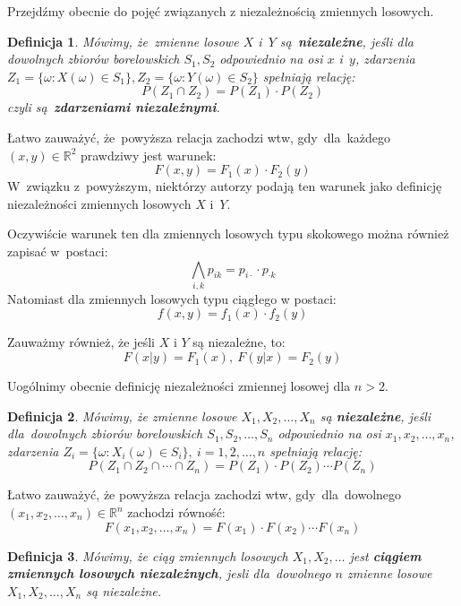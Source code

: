 \documentclass[10pt,a4paper]{article}
\newtheorem{definition}{Definicja}[section]
\numberwithin{equation}{subsection}
\begin{document}
Przejdźmy obecnie do pojęć związanych z niezależnością zmiennych losowych.
\begin{definition}
  Mówimy, że~zmienne losowe $X$ i~$Y$ są~\textbf{niezależne}, jeśli dla
  dowolnych zbiorów borelowskich $S_1,S_2$ odpowiednio na osi $x$ i~$y$,
  zdarzenia $Z_1=\{\omega:X(\omega)\in S_1\}, Z_2=\{\omega:Y(\omega)\in S_2\}$
  spełniają relację:
  \begin{equation}
    P(Z_1\cap Z_2) = P(Z_1)\cdot P(Z_2)
  \end{equation}
  czyli są~\textbf{zdarzeniami niezależnymi}.
\end{definition}

Łatwo zauważyć, że~powyższa relacja zachodzi wtw, gdy~dla~każdego
$(x,y)\in\mathbb{R}^2$ prawdziwy jest warunek:
\[
  F(x,y)=F_1(x)\cdot F_2(y)
\]
W~związku z~powyższym, niektórzy autorzy podają ten warunek jako definicję
niezależności zmiennych losowych $X$ i~$Y$.

Oczywiście warunek ten dla zmiennych losowych typu skokowego można również
zapisać w~postaci:
\[
  \bigwedge_{i,k}p_{ik}=p_{i\cdot}\cdot p_{\cdot k}
\]
Natomiast dla zmiennych losowych typu ciągłego w postaci:
\[
  f(x,y)=f_1(x)\cdot f_2(y)
\]

Zauważmy również, że jeśli $X$ i $Y$ są niezależne, to:
\[
  F(x|y) = F_1(x),~F(y|x)=F_2(y)
\]

Uogólnimy obecnie definicję niezależności zmiennej losowej dla $n>2$.
\begin{definition}
  Mówimy, że zmienne losowe $X_1,X_2,\dotsc,X_n$ są \textbf{niezależne}, jeśli
  dla~dowolnych zbiorów borelowskich $S_1,S_2,\dotsc,S_n$ odpowiednio na osi
  $x_1,x_2,\dotsc,x_n$, zdarzenia $Z_i=\{\omega:X_i(\omega)\in S_i\},~i=1,2,
  \dotsc,n$ spełniają relację:
  \begin{equation}
    P(Z_1\cap Z_2 \cap\dotsb\cap Z_n) = P(Z_1)\cdot P(Z_2) \dotsm P(Z_n)
  \end{equation}
\end{definition}

Łatwo zauważyć, że powyższa relacja zachodzi wtw, gdy~dla~dowolnego
$(x_1,x_2,\dotsc,x_n)\in\mathbb{R}^n$ zachodzi równość:
\[
  F(x_1,x_2,\dotsc,x_n) = F(x_1) \cdot F(x_2) \dotsm F(x_n)
\]
\begin{definition}
  Mówimy, że ciąg zmiennych losowych $X_1,X_2,\dotsc$ jest \textbf{ciągiem
    zmiennych losowych niezależnych}, jesli dla~dowolnego $n$ zmienne losowe
  $X_1,X_2,\dotsc,X_n$ są niezależne.
\end{definition}
\end{document}

